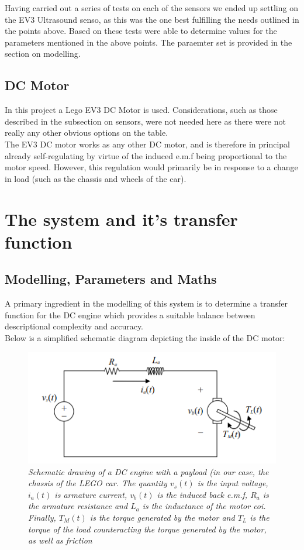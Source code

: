 \documentclass[a4paper,onecolumn,amsmath,amssymb]{revtex4-1}
\begin{document}
Having carried out a series of tests on each of the sensors we ended up settling on the EV3 Ultrasound senso, as this was the one best fulfilling the needs outlined in the points above. Based on these tests were able to determine values for the parameters mentioned in the above points. The paraemter set is provided in the section on modelling.
\subsection{\textbf{DC Motor}}
In this project a Lego EV3 DC Motor is used. Considerations, such as those described in the subsection on sensors, were not needed here as there were not really any other obvious options on the table.\\

The EV3 DC motor works as any other DC motor, and is therefore in principal already self-regulating by virtue of the induced e.m.f being proportional to the motor speed. However, this regulation would primarily be in response to a change in load (such as the chassis and wheels of the car).
\section{\textbf{The system and it's transfer function}}
\subsection{\textbf{Modelling, Parameters and Maths}}
A primary ingredient in the modelling of this system is to determine a transfer function for the DC engine which provides a suitable balance between descriptional complexity and accuracy.\\ 

Below is a simplified schematic diagram depicting the inside of the DC motor:\\
\begin{figure}
\includegraphics[width=\textwidth]{DCMotor_with_load.png}
\caption{\textit{Schematic drawing of a DC engine with a payload (in our case, the chassis of the LEGO car. The quantity $v_s (t)$ is the input voltage, $i_a (t)$ is armature current, $v_b(t)$ is the induced back e.m.f, $R_a$ is the armature resistance and $L_a$ is the inductance of the motor coi. Finally, $T_M (t)$ is the torque generated by the motor and $T_L $ is the torque of the load counteracting the torque generated by the motor, as well as friction }\label{fig:dcmotorwithload}}
\end{figure}
\end{document}
